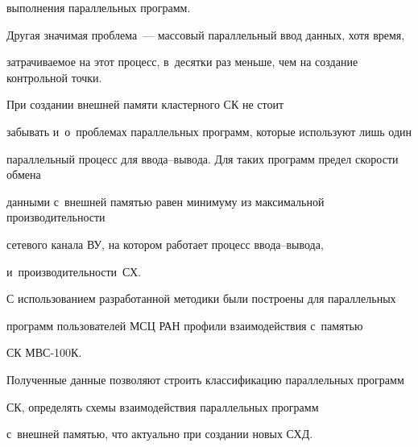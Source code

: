 выполнения параллельных программ.





      Другая значимая проблема~--- массовый параллельный ввод данных, хотя время,


затрачиваемое на этот процесс, в~десятки раз меньше, чем на создание контрольной точки.





      При создании внешней памяти кластерного СК не стоит


забывать и~о~проб\-ле\-мах параллельных программ, которые используют лишь один


параллельный процесс для вво\-да--вы\-во\-да. Для таких программ предел ско\-рости обмена


данными с~внешней памятью равен минимуму из максимальной производительности


сетевого канала ВУ, на котором работает процесс вво\-да--вы\-во\-да,


и~производительности~СХ.





      С использованием разработанной методики были построены для параллельных


программ пользователей МСЦ РАН профили взаимодействия с~памятью


СК МВС-100К.





      Полученные данные позволяют строить классификацию параллельных программ


СК, определять схемы взаимодействия параллельных программ


с~внеш\-ней памятью, что актуально при создании новых СХД.








